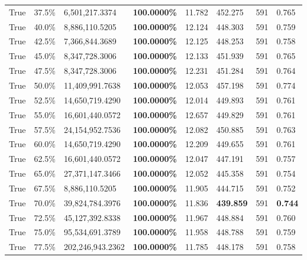 \begin{table}[H]
\begin{tabular}{lllrllll}
\cline{1-8}
True & 37.5\% & 6,501,217.3374 & \bfseries \color{red} 100.0000\% & 11.782 & 452.275 & 591 & 0.765 \\
\cline{1-8}
True & 40.0\% & 8,886,110.5205 & \bfseries \color{red} 100.0000\% & 12.124 & 448.303 & 591 & 0.759 \\
\cline{1-8}
True & 42.5\% & 7,366,844.3689 & \bfseries \color{red} 100.0000\% & 12.125 & 448.253 & 591 & 0.758 \\
\cline{1-8}
True & 45.0\% & 8,347,728.3006 & \bfseries \color{red} 100.0000\% & 12.133 & 451.939 & 591 & 0.765 \\
\cline{1-8}
True & 47.5\% & 8,347,728.3006 & \bfseries \color{red} 100.0000\% & 12.231 & 451.284 & 591 & 0.764 \\
\cline{1-8}
True & 50.0\% & 11,409,991.7638 & \bfseries \color{red} 100.0000\% & 12.053 & 457.198 & 591 & 0.774 \\
\cline{1-8}
True & 52.5\% & 14,650,719.4290 & \bfseries \color{red} 100.0000\% & 12.014 & 449.893 & 591 & 0.761 \\
\cline{1-8}
True & 55.0\% & 16,601,440.0572 & \bfseries \color{red} 100.0000\% & 12.657 & 449.829 & 591 & 0.761 \\
\cline{1-8}
True & 57.5\% & 24,154,952.7536 & \bfseries \color{red} 100.0000\% & 12.082 & 450.885 & 591 & 0.763 \\
\cline{1-8}
True & 60.0\% & 14,650,719.4290 & \bfseries \color{red} 100.0000\% & 12.209 & 449.655 & 591 & 0.761 \\
\cline{1-8}
True & 62.5\% & 16,601,440.0572 & \bfseries \color{red} 100.0000\% & 12.047 & 447.191 & 591 & 0.757 \\
\cline{1-8}
True & 65.0\% & 27,371,147.3466 & \bfseries \color{red} 100.0000\% & 12.052 & 445.358 & 591 & 0.754 \\
\cline{1-8}
True & 67.5\% & 8,886,110.5205 & \bfseries \color{red} 100.0000\% & 11.905 & 444.715 & 591 & 0.752 \\
\cline{1-8}
True & 70.0\% & 39,824,784.3976 & \bfseries \color{red} 100.0000\% & 11.836 & \bfseries \color{red} 439.859 & 591 & \bfseries \color{red} 0.744 \\
\cline{1-8}
True & 72.5\% & 45,127,392.8338 & \bfseries \color{red} 100.0000\% & 11.967 & 448.884 & 591 & 0.760 \\
\cline{1-8}
True & 75.0\% & 95,534,691.3789 & \bfseries \color{red} 100.0000\% & 11.958 & 448.788 & 591 & 0.759 \\
\cline{1-8}
True & 77.5\% & 202,246,943.2362 & \bfseries \color{red} 100.0000\% & 11.785 & 448.178 & 591 & 0.758 \\

\end{tabular}
\end{table}
